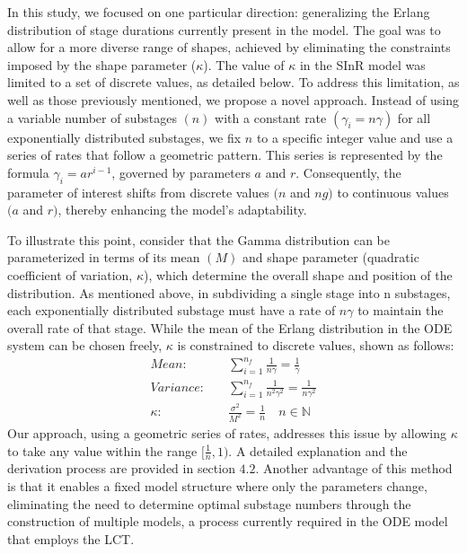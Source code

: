 \documentclass[12pt]{article}
\begin{document}
In this study, we focused on one particular direction: generalizing the Erlang distribution of stage durations currently present in the model. The goal was to allow for a more diverse range of shapes, achieved by eliminating the constraints imposed by the shape parameter ($\kappa$). The value of $\kappa$ in the SInR model was limited to a set of discrete values, as detailed below. To address this limitation, as well as those previously mentioned, we propose a novel approach. Instead of using a variable number of substages $(n)$ with a constant rate $(\gamma_i = n\gamma)$ for all exponentially distributed substages, we fix $n$ to a specific integer value and use a series of rates that follow a geometric pattern. This series is represented by the formula $\gamma_i = ar^{i-1}$, governed by parameters $a$ and $r$. Consequently, the parameter of interest shifts from discrete values $(n$ and $ng)$ to continuous values $(a$ and $r)$, thereby enhancing the model's adaptability.

To illustrate this point, consider that the Gamma distribution can be parameterized in terms of its mean $(M)$ and shape parameter (quadratic coefficient of variation, $\kappa$), which determine the overall shape and position of the distribution. As mentioned above, in subdividing a single stage into n substages, each exponentially distributed substage must have a rate of $n\gamma$ to maintain the overall rate of that stage. While the mean of the Erlang distribution in the ODE system can be chosen freely, $\kappa$ is constrained to discrete values, shown as follows:
\begin{align*}
    Mean: \quad &\sum_{i=1}^{n_f} \frac{1}{n\gamma} = \frac{1}{\gamma}\\
    Variance: \quad &\sum_{i=1}^{n_f} \frac{1}{n^2\gamma^2} = \frac{1}{n\gamma^2} \\
    \kappa: \quad &\frac{\sigma^2}{M^2} = \frac{1}{n} \quad n \in \mathbb{N}
\end{align*}
Our approach, using a geometric series of rates, addresses this issue by allowing $\kappa$ to take any value within the range $[\frac{1}{n}, 1)$. A detailed explanation and the derivation process are provided in section $4.2$. Another advantage of this method is that it enables a fixed model structure where only the parameters change, eliminating the need to determine optimal substage numbers through the construction of multiple models, a process currently required in the ODE model that employs the LCT.
\end{document}
